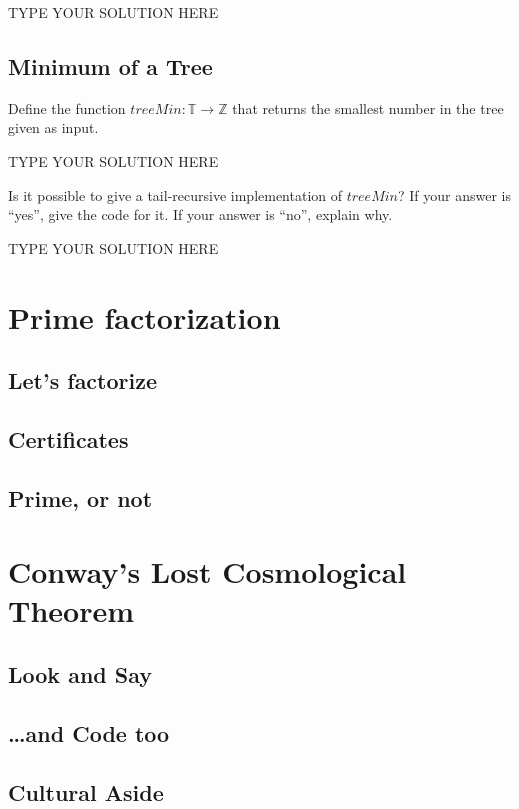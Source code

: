 \documentclass[11pt]{article}
\newcommand{\declarecommand}[1]{\providecommand{#1}{}\renewcommand{#1}}
\begin{document}
\begin{solution}
TYPE YOUR SOLUTION HERE
\end{solution}


\declarecommand{\Leaf}{\mathit{Leaf}}
\declarecommand{\Node}{\mathit{Node}}
\declarecommand{\treeOp}{\mathit{treeMin}}
\declarecommand{\op}[2]{\min\{#1,#2\}}
\subsection{Minimum of a Tree}

\begin{task}{2} %
Define the function $\treeOp: \mathbb{T} \rightarrow \mathbb{Z}$ that returns
the smallest number in the tree given as input.
\end{task}

\begin{solution}
TYPE YOUR SOLUTION HERE
\end{solution}


\addtocounter{taskNum}{1}
\begin{task}{1} %
Is it possible to give a tail-recursive implementation of $\treeOp$?  If your
answer is ``yes'', give the code for it.  If your answer is ``no'', explain why.
\end{task}

\begin{solution}
TYPE YOUR SOLUTION HERE
\end{solution}


\section{Prime factorization}

\subsection{Let's factorize}

\addtocounter{taskNum}{1}
\addtocounter{taskNum}{1}
\subsection{Certificates}

\addtocounter{taskNum}{1}
\addtocounter{taskNum}{1}
\subsection{Prime, or not}

\addtocounter{taskNum}{1}
\addtocounter{taskNum}{1}
\addtocounter{taskNum}{1}
\section{Conway's Lost Cosmological Theorem}

\subsection{Look and Say}

\subsection{\ldots and Code too}

\addtocounter{taskNum}{1}
\addtocounter{taskNum}{1}
\addtocounter{taskNum}{1}
\subsection{Cultural Aside}
\end{document}
